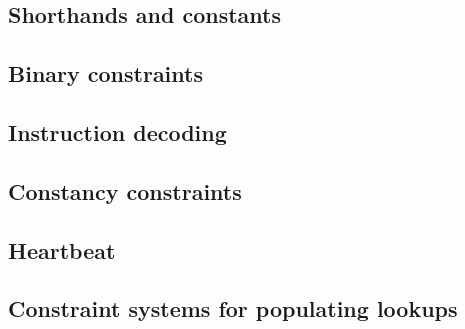 \subsection{Shorthands and constants}                    \label{oob: generalities: shorthands}                
\subsection{Binary constraints}                          \label{oob: generalities: binary}                    
\subsection{Instruction decoding}                        \label{oob: generalities: instruction decoding}      
\subsection{Constancy constraints}                       \label{oob: generalities: counter-constancies}       
\subsection{Heartbeat}                                   \label{oob: generalities: heartbeat}                 
\subsection{Constraint systems for populating lookups}   \label{oob: generalities: specialized constraints}   
